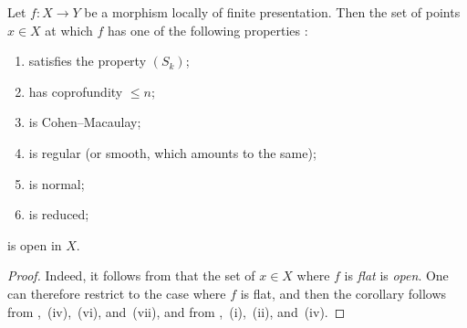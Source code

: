 \begin{corollary}[12.1.7]
\label{IV.12.1.7}
Let $f:X\to Y$ be a morphism locally of finite presentation.
Then the set of points $x\in X$ at which $f$ has one of the following properties :
\begin{enumerate}[label=\textup{(\roman*)}]
  \item satisfies the property $(S_k)$;
  \item has coprofundity $\leqslant n$;
  \item is Cohen--Macaulay;
  \item is regular \textup{(or} smooth\textup{, which amounts to the same)};
  \item is normal;
  \item is reduced;
\end{enumerate}
is open in $X$.
\end{corollary}

\begin{proof}
Indeed, it follows from  that the set of $x\in X$ where $f$ is \emph{flat} is \emph{open}.
One can therefore restrict to the case where $f$ is flat, and then the corollary follows from ,~(iv),~(vi), and~(vii), and from ,~(i),~(ii), and~(iv).
\end{proof}

